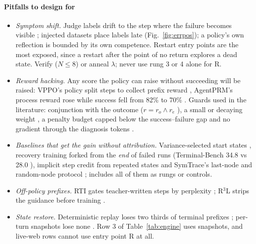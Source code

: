 \paragraph{Pitfalls to design for}
\begin{itemize}[leftmargin=1.1em]
\item \emph{Symptom shift.} Judge labels drift to the step where the failure becomes visible \cite{shen2026epv}; injected datasets place labels late (Fig.~\ref{fig:errpos}); a policy's own reflection is bounded by its own competence. Restart entry points are the most exposed, since a restart after the point of no return explores a dead state. Verify ($N\le8$) or anneal $\lambda$; never use rung 3 or 4 alone for R.
\item \emph{Reward hacking.} Any score the policy can raise without succeeding will be raised: VPPO's policy split steps to collect prefix reward \cite{liu2026vppo}, AgentPRM's process reward rose while success fell from 82\% to 70\% \cite{choudhury2025agentprm}. Guards used in the literature: conjunction with the outcome ($r=r_o\wedge r_e$ \cite{tian2026mirl}), a small or decaying weight \cite{agentevolver2025,zhao2026credithurts}, a penalty budget capped below the success--failure gap and no gradient through the diagnosis tokens \cite{zhu2026fault}.
\item \emph{Baselines that get the gain without attribution.} Variance-selected start states \cite{pivotrl2026}, recovery training forked from the \emph{end} of failed runs (Terminal-Bench 34.8 vs 28.0 \cite{reterm2026}), implicit step credit from repeated states \cite{feng2025gigpo} and SymTrace's last-node and random-node protocol \cite{luan2026symtrace};  includes all of them as rungs or controls.
\item \emph{Off-policy prefixes.} RTI gates teacher-written steps by perplexity \cite{chen2026rti}; R$^3$L strips the guidance before training \cite{shi2026r3l}.
\item \emph{State restore.} Deterministic replay loses two thirds of terminal prefixes \cite{tian2026mirl}; per-turn snapshots lose none \cite{liu2026sprout}. Row 3 of Table~\ref{tab:engine} uses snapshots, and live-web rows cannot use entry point R at all.
\end{itemize}

